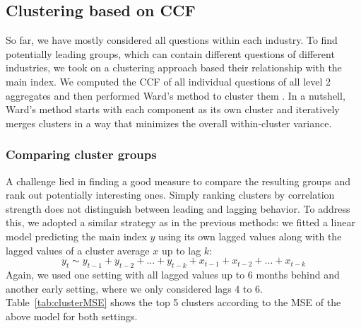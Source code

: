 \newpage
\subsection{Clustering based on CCF}
So far, we have mostly considered all questions within each industry. To find potentially leading groups, which can contain different questions of different industries, we took on a clustering approach based their relationship with the main index. We computed the CCF of all individual questions of all level 2 aggregates and then performed Ward's method to cluster them \citep{ward1963hierarchical}. In a nutshell, Ward's method starts with each component as its own cluster and iteratively merges clusters in a way that minimizes the overall within-cluster variance.

\subsubsection{Comparing cluster groups}
A challenge lied in finding a good measure to compare the resulting groups and rank out potentially interesting ones. Simply ranking clusters by correlation strength does not distinguish between leading and lagging behavior. To address this, we adopted a similar strategy as in the previous methods: we fitted a linear model predicting the main index $y$ using its own lagged values along with the lagged values of a cluster average $x$ up to lag $k$:
\[
y_t \sim y_{t-1} + y_{t-2} + ... + y_{t-k} + x_{t-1} + x_{t-2} + ... + x_{t-k} 
\]
Again, we used one setting with all lagged values up to 6 months behind and another early setting, where we only considered lags 4 to 6. Table~\ref{tab:clusterMSE} shows the top 5 clusters according to the MSE of the above model for both settings. 
